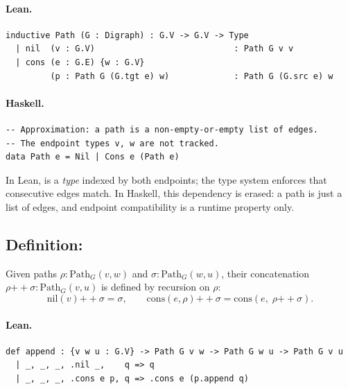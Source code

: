 \documentclass[11pt,a4paper]{article}
\begin{document}
\paragraph{Lean.}
\begin{lstlisting}[style=lean]
inductive Path (G : Digraph) : G.V -> G.V -> Type
  | nil  (v : G.V)                            : Path G v v
  | cons (e : G.E) {w : G.V}
         (p : Path G (G.tgt e) w)             : Path G (G.src e) w
\end{lstlisting}

\paragraph{Haskell.}
\begin{lstlisting}[style=haskell]
-- Approximation: a path is a non-empty-or-empty list of edges.
-- The endpoint types v, w are not tracked.
data Path e = Nil | Cons e (Path e)
\end{lstlisting}

\begin{fidelitynote}
In Lean,  is a \emph{type} indexed by both endpoints; the
type system enforces that consecutive edges match.  In Haskell, this
dependency is erased: a path is just a list of edges, and endpoint
compatibility is a runtime property only.
\end{fidelitynote}


\subsection{Definition: }

\begin{defn}
Given paths $\rho : \mathrm{Path}_G(v, w)$ and $\sigma : \mathrm{Path}_G(w, u)$,
their concatenation $\rho \mathbin{+\!\!+} \sigma : \mathrm{Path}_G(v, u)$ is
defined by recursion on $\rho$:
\[
  \mathrm{nil}(v) \mathbin{+\!\!+} \sigma = \sigma, \qquad
  \mathrm{cons}(e, \rho) \mathbin{+\!\!+} \sigma =
    \mathrm{cons}(e,\; \rho \mathbin{+\!\!+} \sigma).
\]
\end{defn}

\paragraph{Lean.}
\begin{lstlisting}[style=lean]
def append : {v w u : G.V} -> Path G v w -> Path G w u -> Path G v u
  | _, _, _, .nil _,    q => q
  | _, _, _, .cons e p, q => .cons e (p.append q)
\end{lstlisting}
\end{document}
